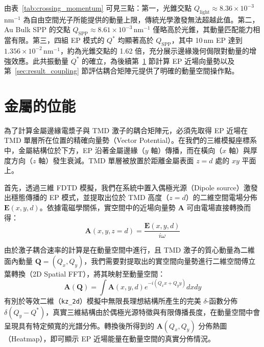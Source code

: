 由表~\ref{tab:crossing_momentum} 可見三點：第一，光錐交點 $Q_{\text{light}} \approx 8.36 \times 10^{-3}$\,nm$^{-1}$ 為自由空間光子所能提供的動量上限，傳統光學激發無法超越此值。第二，Au Bulk SPP 的交點 $Q_{\text{SPP}} \approx 8.61 \times 10^{-3}$\,nm$^{-1}$ 僅略高於光錐，其動量匹配能力相當有限。第三，四組 EP 模式的 $Q^*$ 均顯著高於 $Q_{\text{SPP}}$，其中 10\,nm EP 達到 $1.356 \times 10^{-2}$\,nm$^{-1}$，約為光錐交點的 1.62 倍，充分展示邊緣幾何侷限對動量的增強效應。此共振動量 $Q^*$ 的確立，為後續第~\ref{sec:result_potential} 節計算 EP 近場向量勢以及第~\ref{sec:result_coupling} 節評估耦合矩陣元提供了明確的動量空間操作點。



\section{金屬的位能}
\label{sec:result_potential}

為了計算金屬邊緣電漿子與 TMD 激子的耦合矩陣元，必須先取得 EP 近場在 TMD 單層所在位置的精確向量勢（Vector Potential）。在我們的三維模擬座標系中，金屬結構位於下方，EP 沿著金屬邊緣（$y$ 軸）傳播，而在橫向（$x$ 軸）與厚度方向（$z$ 軸）發生衰減。TMD 單層被放置於距離金屬表面 $z=d$ 處的 $xy$ 平面上。

首先，透過三維 FDTD 模擬，我們在系統中置入偶極光源（Dipole source）激發出穩態傳播的 EP 模式，並提取出位於 TMD 高度（$z=d$）的二維空間電場分佈 $\mathbf{E}(x, y, d)$。依據電磁學關係，實空間中的近場向量勢 $\mathbf{A}$ 可由電場直接轉換而得：
\begin{equation}
	\mathbf{A}(x, y, z=d) = \frac{\mathbf{E}(x, y, d)}{i\omega}
	\label{eq:vector_potential_real}
\end{equation}

由於激子耦合速率的計算是在動量空間中進行，且 TMD 激子的質心動量為二維面內動量 $\mathbf{Q} = (Q_x, Q_y)$，我們需要對提取出的實空間向量勢進行二維空間傅立葉轉換（2D Spatial FFT），將其映射至動量空間：
\begin{equation}
	\mathbf{A}(\mathbf{Q}) = \int \mathbf{A}(x, y, d) e^{-i(Q_x x + Q_y y)} dx dy
	\label{eq:vector_potential_momentum}
\end{equation}
有別於等效二維（\texttt{kz\_2d}）模擬中無限長理想結構所產生的完美 $\delta$-函數分佈 $\delta(Q_y - Q^*)$，真實三維結構由於偶極光源特徵與有限傳播長度，在動量空間中會呈現具有特定頻寬的光譜分佈。轉換後所得到的 $\mathbf{A}(Q_x, Q_y)$ 分佈熱圖（Heatmap），即可顯示 EP 近場能量在動量空間的真實分佈情況。

